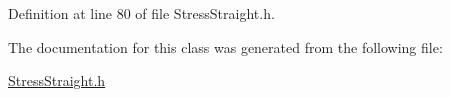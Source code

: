 Definition at line 80 of file Stress\+Straight.\+h.



The documentation for this class was generated from the following file\+:\begin{DoxyCompactItemize}
\item 
\hyperlink{_stress_straight_8h}{Stress\+Straight.\+h}\end{DoxyCompactItemize}
